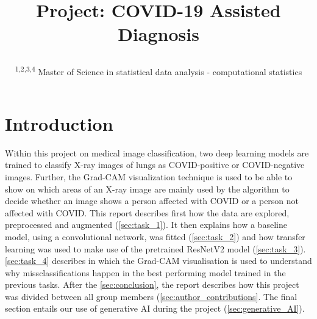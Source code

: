 \documentclass[conference]{IEEEtran}
\begin{document}
\title{Project: COVID-19 Assisted Diagnosis\\


\author{
\and
{}
\and
{}
\and
{}

\and


\textsuperscript{1,2,3,4}  Master of Science in statistical data analysis - computational statistics\hfill}}

\maketitle



\section{Introduction}
Within this project on medical image classification, two deep learning models are trained to classify X-ray images of lungs as COVID-positive or COVID-negative images. Further, the Grad-CAM visualization technique is used to be able to show on which areas of an X-ray image are mainly used by the algorithm to decide whether an image shows a person affected with COVID or a person not affected with COVID. This report describes first how the data are explored, preprocessed and augmented (\ref{sec:task_1}). It then explains how a baseline model, using a convolutional network, was fitted (\ref{sec:task_2}) and how transfer learning was used to make use of the pretrained ResNetV2 model (\ref{sec:task_3}). \ref{sec:task_4} describes in which the Grad-CAM visualisation is used to understand why missclassifications happen in the best performing model trained in the previous tasks.
After the \ref{sec:conclusion}, the report describes how this project was divided between all group members (\ref{sec:author_contributions}. The final section entails our use of generative AI during the project (\ref{sec:generative_AI}).
\end{document}
